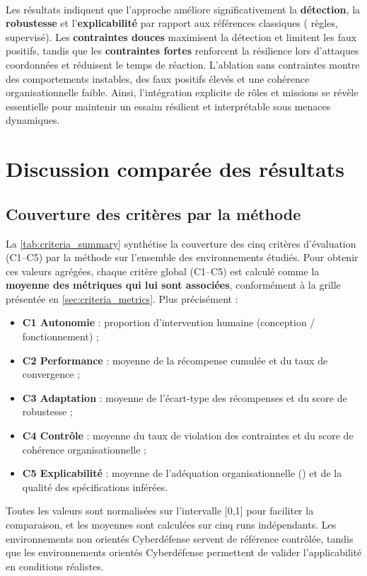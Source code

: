 \

Les résultats indiquent que l'approche  améliore significativement la \textbf{détection}, la \textbf{robustesse} et l'\textbf{explicabilité} par rapport aux références classiques ( règles,  supervisé).
Les \textbf{contraintes douces} maximisent la détection et limitent les faux positifs, tandis que les \textbf{contraintes fortes} renforcent la résilience lors d'attaques coordonnées et réduisent le temps de réaction.
L'ablation sans contraintes montre des comportements instables, des faux positifs élevés et une cohérence organisationnelle faible.
Ainsi, l'intégration explicite de rôles et missions se révèle essentielle pour maintenir un essaim résilient et interprétable sous menaces dynamiques.


\section{Discussion comparée des résultats}

\subsection{Couverture des critères par la méthode}

La \autoref{tab:criteria_summary} synthétise la couverture des cinq critères d'évaluation (C1--C5) par la méthode  sur l'ensemble des environnements étudiés.
Pour obtenir ces valeurs agrégées, chaque critère global (C1--C5) est calculé
comme la \textbf{moyenne des métriques qui lui sont associées}, conformément à la grille
présentée en \autoref{sec:criteria_metrics}. Plus précisément :
\begin{itemize}
  \item \textbf{C1 Autonomie} : proportion d'intervention humaine (conception / fonctionnement) ;
  \item \textbf{C2 Performance} : moyenne de la récompense cumulée et du taux de convergence ;
  \item \textbf{C3 Adaptation} : moyenne de l'écart-type des récompenses et du score de robustesse ;
  \item \textbf{C4 Contrôle} : moyenne du taux de violation des contraintes et du score de cohérence organisationnelle ;
  \item \textbf{C5 Explicabilité} : moyenne de l’adéquation organisationnelle () et de la qualité des spécifications inférées.
\end{itemize}
Toutes les valeurs sont normalisées sur l'intervalle [0,1] pour faciliter la comparaison,
et les moyennes sont calculées sur cinq runs indépendants.
Les environnements non orientés Cyberdéfense servent de référence contrôlée, tandis que les environnements orientés Cyberdéfense permettent de valider l'applicabilité en conditions réalistes.

